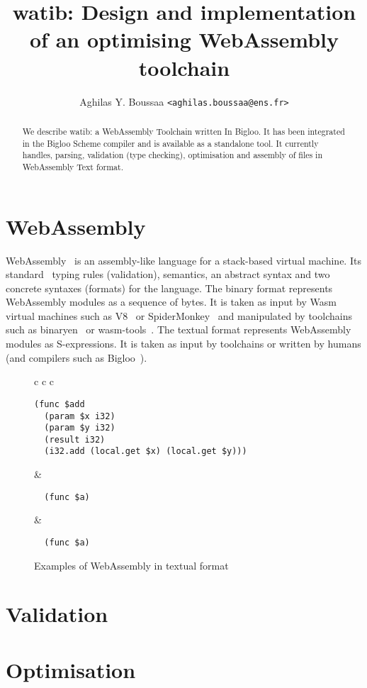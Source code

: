 \documentclass[10pt]{article}
\author{Aghilas Y. Boussaa \texttt{<aghilas.boussaa@ens.fr>}}
\title{\textsf{watib}: Design and implementation of an optimising WebAssembly toolchain}
\begin{document}
\maketitle
\begin{abstract}
  We describe watib: a WebAssembly Toolchain written In Bigloo. It has
  been integrated in the Bigloo Scheme compiler and is available as a standalone
  tool. It currently handles, parsing, validation (type checking), optimisation
  and assembly of files in WebAssembly Text format.
\end{abstract}

\section{WebAssembly}
WebAssembly~\cite{haas2017bringing} is an assembly-like language for a
stack-based virtual machine. Its standard~\cite{WebAssemblyCoreSpecification3}
typing rules (validation), semantics, an abstract syntax and two concrete
syntaxes (formats) for the language. The binary format represents WebAssembly
modules as a sequence of bytes. It is taken as input by Wasm virtual machines
such as V8~\cite{V8} or SpiderMonkey~\cite{SpiderMonkey} and manipulated by
toolchains such as binaryen~\cite{Binaryen} or wasm-tools~\cite{WasmTools}. The
textual format represents WebAssembly modules as S-expressions. It is taken as
input by toolchains or written by humans (and compilers such as Bigloo~\cite{Bigloo}).
\begin{figure}[h]
\centering
\begin{tabular}{c c c}
\begin{minipage}{2in}
\begin{verbatim}
(func $add
  (param $x i32)
  (param $y i32)
  (result i32)
  (i32.add (local.get $x) (local.get $y)))
\end{verbatim}
\end{minipage}&
\begin{minipage}{2in}
\begin{verbatim}
  (func $a)
\end{verbatim}
\end{minipage}
&\begin{minipage}{2in}
\begin{verbatim}
  (func $a)
\end{verbatim}
\end{minipage}
\end{tabular}
\caption{Examples of WebAssembly in textual format}
\end{figure}
\section{Validation}
\section{Optimisation}
\printbibliography
\end{document}
